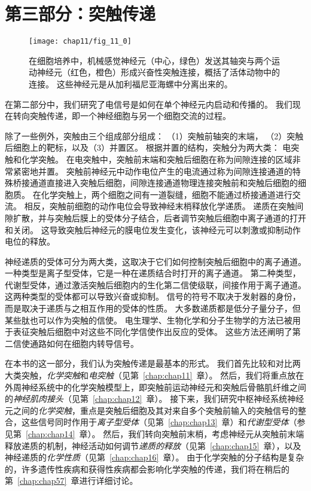 \chapter*{第三部分：突触传递}


\begin{figure}[htbp]
	\centering
	\texttt{[image: chap11/fig\_11\_0]}
	\caption{在细胞培养中，机械感觉神经元（中心，绿色）发送其轴突与两个运动神经元（红色，橙色）形成兴奋性突触连接，概括了活体动物中的连接。
		这些神经元是从加利福尼亚海螺中分离出来的。}
	\label{fig:11_0}
\end{figure}


在第二部分中，我们研究了电信号是如何在单个神经元内启动和传播的。
我们现在转向突触传递，即一个神经细胞与另一个细胞交流的过程。


除了一些例外，突触由三个组成部分组成：
（1）突触前轴突的末端，
（2）突触后细胞上的靶标，以及（3）并置区。
根据并置的结构，突触分为两大类：
电突触和化学突触。
在电突触中，突触前末端和突触后细胞在称为间隙连接的区域非常紧密地并置。
突触前神经元中动作电位产生的电流通过称为间隙连接通道的特殊桥接通道直接进入突触后细胞，间隙连接通道物理连接突触前和突触后细胞的细胞质。
在化学突触上，两个细胞之间有一道裂缝，细胞不能通过桥接通道进行交流。
相反，突触前细胞的动作电位会导致神经末梢释放化学递质。
递质在突触间隙扩散，并与突触后膜上的受体分子结合，后者调节突触后细胞中离子通道的打开和关闭。
这导致突触后神经元的膜电位发生变化，该神经元可以刺激或抑制动作电位的释放。


神经递质的受体可分为两大类，这取决于它们如何控制突触后细胞中的离子通道。
一种类型是离子型受体，它是一种在递质结合时打开的离子通道。
第二种类型，代谢型受体，通过激活突触后细胞内的生化第二信使级联，间接作用于离子通道。
这两种类型的受体都可以导致兴奋或抑制。
信号的符号不取决于发射器的身份，而是取决于递质与之相互作用的受体的性质。
大多数递质都是低分子量分子，但某些肽也可以作为突触的信使。
电生理学、生物化学和分子生物学的方法已被用于表征突触后细胞中对这些不同化学信使作出反应的受体。
这些方法还阐明了第二信使通路如何在细胞内转导信号。


在本书的这一部分，我们认为突触传递是最基本的形式。
我们首先比较和对比两大类突触，\textit{化学突触}和\textit{电突触}（见第~\ref{chap:chap11}~章）。
然后，我们将重点放在外周神经系统中的化学突触模型上，即突触前运动神经元和突触后骨骼肌纤维之间的\textit{神经肌肉接头}（见第~\ref{chap:chap12}~章）。
接下来，我们研究中枢神经系统神经元之间的\textit{化学突触}，重点是突触后细胞及其对来自多个突触前输入的突触信号的整合，这些信号同时作用于\textit{离子型受体}（见第~\ref{chap:chap13}~章）和\textit{代谢型受体}（参见第~\ref{chap:chap14}~章）。
然后，我们转向突触前末梢，考虑神经元从突触前末端释放递质的机制，神经活动如何调节\textit{递质的释放}（见第~\ref{chap:chap15}~章），以及神经递质的\textit{化学性质}（见第~\ref{chap:chap16}~章）。
由于化学突触的分子结构是复杂的，许多遗传性疾病和获得性疾病都会影响化学突触的传递，我们将在稍后的第~\ref{chap:chap57}~章进行详细讨论。


